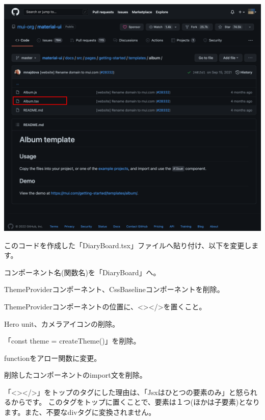 \begin{reviewimage}%
\includegraphics[width=0.6\maxwidth]{./images/03-todo-with-react/mui007-albumLayoutSourceCode.png}%
\label{image:03-todo-with-react:mui007-albumLayoutSourceCode}
\end{reviewimage}

\clearpage


このコードを作成した「DiaryBoard.tsx」ファイルへ貼り付け、以下を変更します。

\begin{starteritemize}
\item コンポーネント名(関数名)を「DiaryBoard」へ。
\item ThemeProviderコンポーネント、CssBaselineコンポーネントを削除。
\item ThemeProviderコンポーネントの位置に、\textless{}\textgreater{}\textless{}/\textgreater{}を置くこと。
\item Hero unit、カメラアイコンの削除。
\item 「const theme = createTheme()」を削除。
\item functionをアロー関数に変更。
\item 削除したコンポーネントのimport文を削除。
\end{starteritemize}

「\textless{}\textgreater{}\textless{}/\textgreater{}」をトップのタグにした理由は、「Jsxはひとつの要素のみ」と怒られるからです。
このタグをトップに置くことで、要素は１つ(ほかは子要素)となります。また、不要なdivタグに変換されません。

